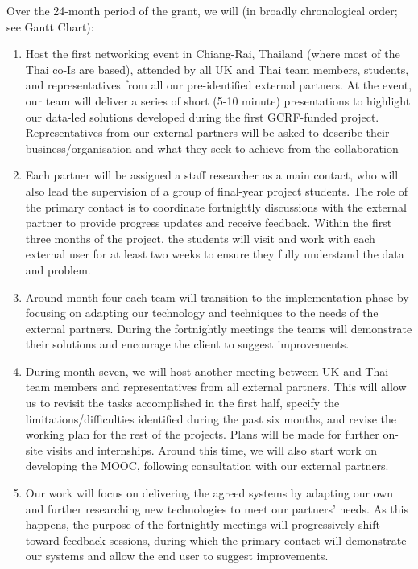 \documentclass[11pt]{article}
\begin{document}
  \vspace{2mm}
  \noindent
  Over the 24-month period of the grant, we will (in broadly chronological order; see Gantt Chart):
  \begin{enumerate}[leftmargin=6mm,itemsep=-3pt,topsep=1pt]
  \item Host the first networking event in Chiang-Rai, Thailand (where most of the Thai co-Is are based), attended by all UK and Thai team members, students, and representatives from all our pre-identified external partners. At the event, our team will deliver a series of short (5-10 minute) presentations to highlight our data-led solutions developed during the first GCRF-funded project. Representatives from our external partners will be asked to describe their business/organisation and what they seek to achieve from the collaboration
  \item Each partner will be assigned a staff researcher as a main contact, who will also lead the supervision of a group of final-year project students. The role of the primary contact is to coordinate fortnightly discussions with the external partner to provide progress updates and receive feedback. Within the first three months of the project, the students will visit and work with each external user for at least two weeks to ensure they fully understand the data and problem.
  \item Around month four each team will transition to the implementation phase by focusing on adapting our technology and techniques to the needs of the external partners. During the fortnightly meetings the teams will demonstrate their solutions and encourage the client to suggest improvements.
  \item During month seven, we will host another meeting between UK and Thai team members and representatives from all external partners. This will allow us to revisit the tasks accomplished in the first half, specify the limitations/difficulties identified during the past six months, and revise the working plan for the rest of the projects. Plans will be made for further on-site visits and internships. Around this time, we will also start work on developing the MOOC, following consultation with our external partners.
  \item Our work will focus on delivering the agreed systems by adapting our own and further researching new technologies to meet our partners' needs. As this happens, the purpose of the fortnightly meetings will progressively shift toward feedback sessions, during which the primary contact will demonstrate our systems and allow the end user to suggest improvements. 

\end{enumerate}
\end{document}
